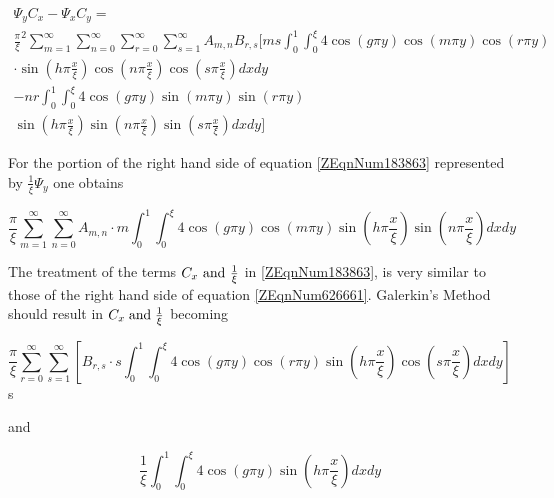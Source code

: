 \begin{equation} \label{ZEqnNum757716} \begin{array}{l} {\Psi _{y} C_{x} -\Psi
_{x} C_{y} =} \\ {\frac{\pi }{\xi } ^{2} \sum _{m=1}^{\infty } \sum
_{n=0}^{\infty } \sum _{r=0}^{\infty } \sum _{s=1}^{\infty }A_{m,n} B_{r,s}
[ms\int _{0}^{1} \int _{0}^{\xi }4\cos \left(g\pi y\right)\cos \left(m\pi
y\right)\cos \left(r\pi y\right) } \\ {\cdot \sin \left(h\pi \frac{x}{\xi}
\right)\cos \left(n\pi \frac{x}{\xi } \right)\cos \left(s\pi \frac{x}{\xi }
\right)dxdy} \\ {-nr\int _{0}^{1} \int _{0}^{\xi }4\cos \left(g\pi y\right)\sin
\left(m\pi y\right)\sin \left(r\pi y\right)} \\ {\sin \left(h\pi \frac{x}{\xi }
\right)\sin \left(n\pi \frac{x}{\xi } \right)\sin \left(s\pi \frac{x}{\xi }
\right)dxdy]} \end{array} \end{equation}

For the portion of the right hand side of equation \eqref{ZEqnNum183863}
represented by $\frac{1}{\xi } \Psi _{y} $ one obtains

\begin{equation} \label{ZEqnNum659914} \frac{\pi }{\xi } \sum _{m=1}^{\infty
} \sum _{n=0}^{\infty }A_{m,n} \cdot m\int _{0}^{1} \int _{0}^{\xi }4\cos
\left(g\pi y\right)\cos \left(m\pi y\right)\sin \left(h\pi \frac{x}{\xi }
\right)\sin \left(n\pi \frac{x}{\xi } \right) dxdy \end{equation}

The treatment of the terms $C_{x} \text{ and } \frac{1}{\xi } $ in
\eqref{ZEqnNum183863}, is very similar to those of the right hand side of
equation \eqref{ZEqnNum626661}. Galerkin's Method should result in $C_{x} {\rm
\; and\; } \frac{1}{\xi } $ becoming

\begin{equation} \label{ZEqnNum392315} \frac{\pi }{\xi } \sum _{r=0}^{\infty
} \sum _{s=1}^{\infty } \left[B_{r,s} \cdot s\int _{0}^{1} \int _{0}^{\xi }4\cos
\left(g\pi y\right)\cos (r\pi y)\sin \left(h\pi \frac{x}{\xi } \right)\cos
\left(s\pi \frac{x}{\xi } \right)dxdy \right] \end{equation}s

and

\begin{equation} \label{ZEqnNum600143} \frac{1}{\xi } \int _{0}^{1} \int
_{0}^{\xi }4\cos \left(g\pi y\right)\sin \left(h\pi \frac{x}{\xi } \right)dxdy
\end{equation} 

